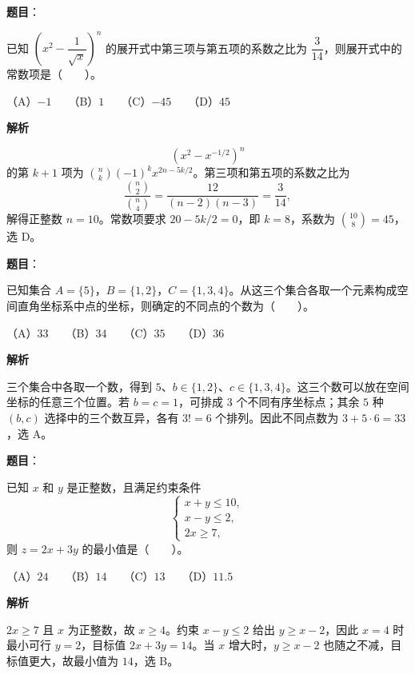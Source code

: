 \begin{answer}

\textbf{题目}：

已知 $\left(x^2-\dfrac1{\sqrt{x}}\right)^n$ 的展开式中第三项与第五项的系数之比为 $\dfrac3{14}$，则展开式中的常数项是\mbox{（　　）}。

（A）$-1$　　（B）$1$　　（C）$-45$　　（D）$45$

\textbf{解析}

\nopagebreak[4]
\[
\left(x^2-x^{-1/2}\right)^n
\]
的第 $k+1$ 项为 $\binom nk(-1)^k x^{2n-5k/2}$。第三项和第五项的系数之比为
\nopagebreak[4]
\[
\frac{\binom n2}{\binom n4}=\frac{12}{(n-2)(n-3)}=\frac3{14},
\]
解得正整数 $n=10$。常数项要求 $20-5k/2=0$，即 $k=8$，系数为 $\binom{10}{8}=45$，选 D。


\end{answer}
\begin{answer}

\textbf{题目}：

已知集合 $A=\{5\}$，$B=\{1,2\}$，$C=\{1,3,4\}$。从这三个集合各取一个元素构成空间直角坐标系中点的坐标，则确定的不同点的个数为\mbox{（　　）}。

（A）$33$　　（B）$34$　　（C）$35$　　（D）$36$

\textbf{解析}

三个集合中各取一个数，得到 $5$、$b\in\{1,2\}$、$c\in\{1,3,4\}$。这三个数可以放在空间坐标的任意三个位置。若 $b=c=1$，可排成 $3$ 个不同有序坐标点；其余 $5$ 种 $(b,c)$ 选择中的三个数互异，各有 $3!=6$ 个排列。因此不同点数为 $3+5\cdot6=33$，选 A。


\end{answer}
\begin{answer}

\textbf{题目}：

已知 $x$ 和 $y$ 是正整数，且满足约束条件
\nopagebreak[4]
\[
\begin{cases}
x+y\le 10,\\
x-y\le 2,\\
2x\ge 7,
\end{cases}
\]
则 $z=2x+3y$ 的最小值是\mbox{（　　）}。

（A）$24$　　（B）$14$　　（C）$13$　　（D）$11.5$

\textbf{解析}

$2x\ge7$ 且 $x$ 为正整数，故 $x\ge4$。约束 $x-y\le2$ 给出 $y\ge x-2$，因此 $x=4$ 时最小可行 $y=2$，目标值 $2x+3y=14$。当 $x$ 增大时，$y\ge x-2$ 也随之不减，目标值更大，故最小值为 $14$，选 B。


\end{answer}
